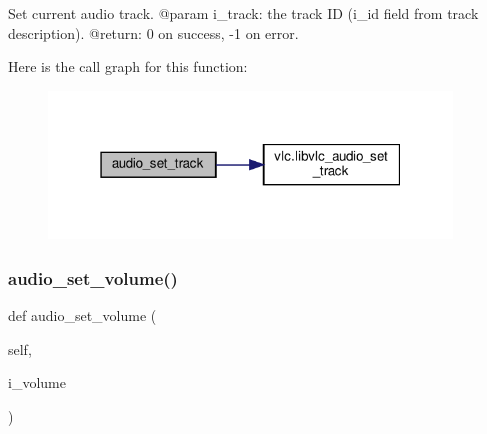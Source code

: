 \begin{DoxyVerb}Set current audio track.
@param i_track: the track ID (i_id field from track description).
@return: 0 on success, -1 on error.
\end{DoxyVerb}
 Here is the call graph for this function\+:
\nopagebreak
\begin{figure}[H]
\begin{center}
\leavevmode
\includegraphics[width=304pt]{classvlc_1_1_media_player_a705fbd168baaefb6ee78d814090a7919_cgraph}
\end{center}
\end{figure}
\mbox{\label{classvlc_1_1_media_player_ab4c2d886df0b4e9883063292807d293f}} 
\subsubsection{\texorpdfstring{audio\+\_\+set\+\_\+volume()}{audio\_set\_volume()}}
{\footnotesize\ttfamily def audio\+\_\+set\+\_\+volume (\begin{DoxyParamCaption}\item[{}]{self,  }\item[{}]{i\+\_\+volume }\end{DoxyParamCaption})}

